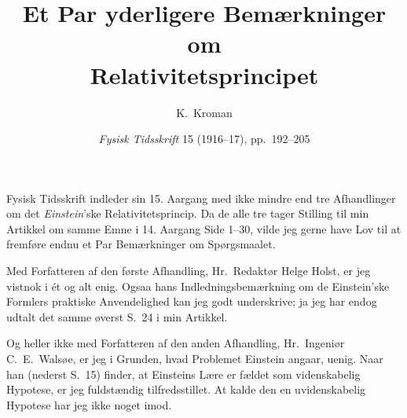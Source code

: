 \documentclass[12pt,a4paper]{article}
\title{\textbf{\textbf{Et Par yderligere Bemærkninger om}\\[2pt]\guillemotright Relativitetsprincipet\guillemotleft}}
\author{K.\ Kroman}
\date{\textit{Fysisk Tidsskrift} 15 (1916--17), pp.~192--205}
\newcommand{\opage}[1]{\marginnote{\footnotesize\textit{[#1]}}}
\begin{document}
\maketitle

\opage{192} %

Fysisk Tidsskrift indleder sin 15. Aargang med ikke mindre end tre
Afhandlinger om det \emph{Einstein}'ske Relativitetsprincip. Da de alle tre
tager Stilling til min Artikkel om samme Emne i 14. Aargang Side 1--30, vilde
jeg gerne have Lov til at fremføre endnu et Par Bemærkninger om Spørgsmaalet.

Med Forfatteren af den første Afhandling, Hr.\ Redaktør Helge Holst, er jeg
vistnok i ét og alt enig. Ogsaa hans Indledningsbemærkning om de Einstein'ske
Formlers praktiske Anvendelighed kan jeg godt underskrive; ja jeg har endog
udtalt det samme øverst S.\ 24 i min Artikkel.

Og heller ikke med Forfatteren af den anden Afhandling, Hr.\ Ingeniør
C.\ E.\ Walsøe, er jeg i Grunden, hvad Problemet Einstein angaar, uenig. Naar
han (nederst S.\ 15) finder, at Einsteins Lære er fældet som videnskabelig
Hypotese, er jeg fuldstændig tilfredsstillet. At kalde den en uvidenskabelig
Hypotese har jeg ikke noget imod.
\end{document}
